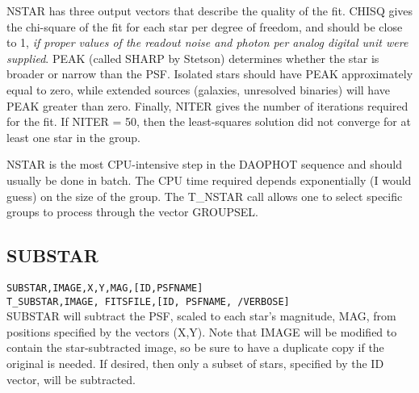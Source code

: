 NSTAR has three output vectors that describe the quality of the fit.
CHISQ gives the chi-square of the fit for each star per degree of freedom,
and should be close to 1, {\em if  proper values of the readout noise
and photon per analog digital unit were supplied}.  
PEAK (called SHARP by Stetson) determines
whether the star is broader or narrow than the PSF.  Isolated stars should
have PEAK approximately equal to zero, while extended sources (galaxies,
unresolved binaries) will have PEAK greater than zero.  Finally, NITER
gives the number of iterations required for the fit.  If NITER = 50, then
the least-squares solution did not converge for at least one star in the
group.

NSTAR is the most CPU-intensive step in the DAOPHOT sequence and should
usually be done in batch.  The CPU time required depends exponentially
(I would guess) on the size of the group.   
The T\_NSTAR call allows one to select specific
groups to process through the vector GROUPSEL.  
\subsection{SUBSTAR}
{\tt SUBSTAR,IMAGE,X,Y,MAG,[ID,PSFNAME]}  \\
{\tt T\_SUBSTAR,IMAGE, FITSFILE,[ID, PSFNAME, /VERBOSE]} \\

SUBSTAR will subtract the PSF, scaled to each star's magnitude, MAG, 
from positions specified by the vectors (X,Y).  Note that IMAGE
will be modified to contain the star-subtracted image, so be sure to 
have a duplicate copy if the original is needed.
If desired, then only a subset of stars, specified by the ID vector,
will be subtracted.
                   
                                        
